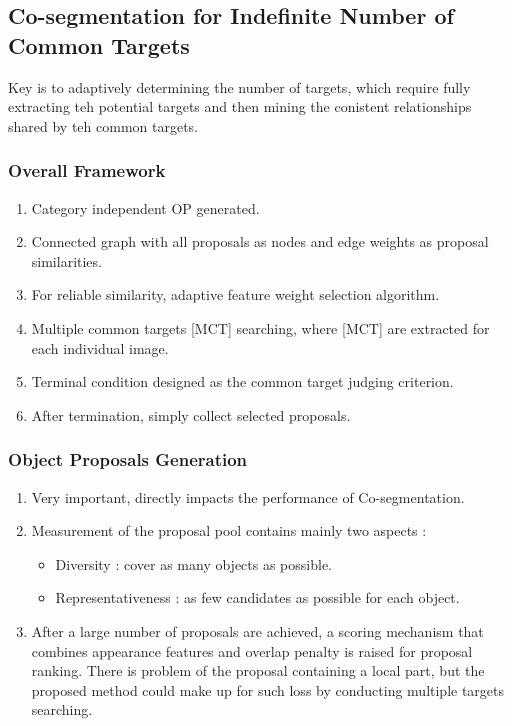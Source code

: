 \documentclass{article}
\begin{document}
\subsection{Co-segmentation for Indefinite Number of Common Targets}
Key is to adaptively determining the number of targets, which require fully extracting teh potential targets and then mining the conistent relationships shared by teh common targets.

\subsubsection{Overall Framework}
\begin{enumerate}
\item Category independent OP generated.
\item Connected graph with all proposals as nodes and edge weights as proposal similarities.
\item For reliable similarity, adaptive feature weight selection algorithm.
\item Multiple common targets [MCT] searching, where [MCT] are extracted for each individual image.
\item Terminal condition designed as the common target judging criterion.
\item After termination, simply collect selected proposals.
\end{enumerate}

\subsubsection{Object Proposals Generation}
\begin{enumerate}
\item Very important, directly impacts the performance of Co-segmentation.
\item Measurement of the proposal pool contains mainly two aspects :
  \begin{itemize}
  \item Diversity : cover as many objects as possible.
  \item Representativeness : as few candidates as possible for each object.
  \end{itemize}
\item After a large number of proposals are achieved, a scoring mechanism that combines appearance features and overlap penalty is raised for proposal ranking. There is problem of the proposal containing a local part, but the proposed method could make up for such loss by conducting multiple targets searching.
\end{enumerate}
\end{document}
